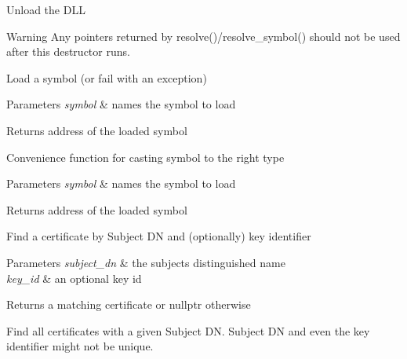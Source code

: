Unload the D\+LL \begin{DoxyWarning}{Warning}
Any pointers returned by resolve()/resolve\+\_\+symbol() should not be used after this destructor runs.
\end{DoxyWarning}
Load a symbol (or fail with an exception) 
\begin{DoxyParams}{Parameters}
{\em symbol} & names the symbol to load \\
\hline
\end{DoxyParams}
\begin{DoxyReturn}{Returns}
address of the loaded symbol
\end{DoxyReturn}
Convenience function for casting symbol to the right type 
\begin{DoxyParams}{Parameters}
{\em symbol} & names the symbol to load \\
\hline
\end{DoxyParams}
\begin{DoxyReturn}{Returns}
address of the loaded symbol
\end{DoxyReturn}
Find a certificate by Subject DN and (optionally) key identifier 
\begin{DoxyParams}{Parameters}
{\em subject\+\_\+dn} & the subject\textquotesingle{}s distinguished name \\
\hline
{\em key\+\_\+id} & an optional key id \\
\hline
\end{DoxyParams}
\begin{DoxyReturn}{Returns}
a matching certificate or nullptr otherwise
\end{DoxyReturn}
Find all certificates with a given Subject DN. Subject DN and even the key identifier might not be unique.

